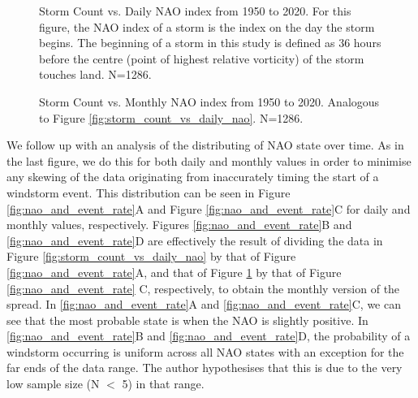 \begin{figure}[ht]
\begin{minipage}[t]{0.4\textwidth}
                \caption{Storm Count vs. Daily NAO index from 1950 to 2020. For this figure, the NAO index of a storm is the index on the day the storm begins. The beginning of a storm in this study is defined as 36 hours before the centre (point of highest relative vorticity) of the storm touches land. N=1286.}
                \label{fig:storm_count_vs_daily_nao}
                \vspace*{88pt}  %
                \caption{Storm Count vs. Monthly NAO index from 1950 to 2020. Analogous to Figure \ref{fig:storm_count_vs_daily_nao}. N=1286.}
                \label{fig:storm_count_vs_monthly_nao}
            \end{minipage}
        \end{figure}

    We follow up with an analysis of the distributing of NAO state over time. As in the last figure, we do this for both daily and monthly values in order to minimise any skewing of the data originating from inaccurately timing the start of a windstorm event. This distribution can be seen in Figure \ref{fig:nao_and_event_rate}A and Figure \ref{fig:nao_and_event_rate}C for daily and monthly values, respectively. Figures \ref{fig:nao_and_event_rate}B and \ref{fig:nao_and_event_rate}D are effectively the result of dividing the data in Figure \ref{fig:storm_count_vs_daily_nao} by that of Figure \ref{fig:nao_and_event_rate}A, and that of Figure \ref{fig:storm_count_vs_monthly_nao} by that of Figure \ref{fig:nao_and_event_rate} C, respectively, to obtain the monthly version of the spread. In \ref{fig:nao_and_event_rate}A and \ref{fig:nao_and_event_rate}C, we can see that the most probable state is when the NAO is slightly positive. In \ref{fig:nao_and_event_rate}B and \ref{fig:nao_and_event_rate}D, the probability of a windstorm occurring is uniform across all NAO states with an exception for the far ends of the data range. The author hypothesises that this is due to the very low sample size (N $<$ 5) in that range.
    
